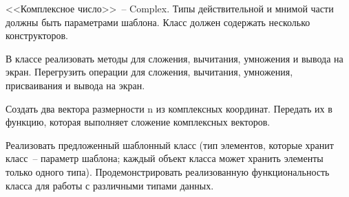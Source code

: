 
<<Комплексное число>>~-- Complex. Типы действительной и мнимой части должны быть
параметрами шаблона. Класс должен содержать несколько конструкторов.

В классе
реализовать методы для сложения, вычитания, умножения и вывода на экран. Перегрузить
операции для сложения, вычитания, умножения, присваивания и вывода на экран.

Создать
два вектора размерности n из комплексных координат. Передать их в функцию, которая
выполняет сложение комплексных векторов.

Реализовать предложенный шаблонный класс (тип элементов, которые
хранит класс~-- параметр шаблона; каждый объект класса может хранить
элементы только одного типа). Продемонстрировать реализованную
функциональность класса для работы с различными типами данных.

